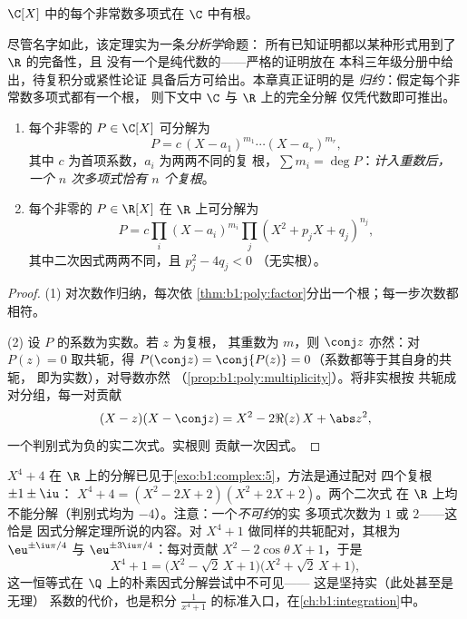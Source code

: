 \begin{theorem}[代数基本定理]\label{thm:b1:poly:fta}
$\C[X]$ 中的每个非常数多项式在
$\C$ 中有根。
\end{theorem}
\admitted

\begin{remark}
尽管名字如此，该定理实为一条\emph{分析学}命题：
所有已知证明都以某种形式用到了 $\R$ 的完备性，且
没有一个是纯代数的——严格的证明放在
本科三年级分册中给出，待复积分或紧性论证
具备后方可给出。本章真正证明的是
\emph{归约}：假定每个非常数多项式都有一个根，
则下文中 $\C$ 与 $\R$ 上的完全分解
仅凭代数即可推出。
\end{remark}

\begin{corollary}[$\C$ 与 $\R$ 上的因式分解]\label{cor:b1:poly:factorization}
\begin{enumerate}
  \item 每个非零的 $P \in \C[X]$ 可分解为
        \[
        P = c\, (X - a_1)^{m_1} \cdots (X - a_r)^{m_r},
        \]
        其中 $c$ 为首项系数，$a_i$ 为两两不同的复
        根，$\sum m_i = \deg P$：\emph{计入重数后，
        一个 $n$ 次多项式恰有 $n$ 个复根}。
  \item 每个非零的 $P \in \R[X]$ 在 $\R$ 上可分解为
        \[
        P = c \prod_i (X - a_i)^{m_i} \prod_j (X^2 + p_j X +
        q_j)^{n_j},
        \]
        其中二次因式两两不同，且 $p_j^2 - 4q_j < 0$
        （无实根）。
\end{enumerate}
\end{corollary}

\begin{proof}
(1) 对次数作归纳，每次依
\cref{thm:b1:poly:factor}分出一个根；每一步次数都相符。

(2) 设 $P$ 的系数为实数。若 $z$ 为复根，
其重数为 $m$，则 $\conj z$ 亦然：对 $P(z) = 0$ 取共轭，得
$P(\conj z) = \conj{P(z)} = 0$（系数都等于其自身的共轭，
即为实数），对导数亦然
（\cref{prop:b1:poly:multiplicity}）。将非实根按
共轭成对分组，每一对贡献
\[
(X - z)(X - \conj z) = X^2 - 2\Re(z)\, X + \abs z^2 ,
\]
一个判别式为负的实二次式。实根则
贡献一次因式。
\end{proof}

\begin{example}\label{ex:b1:poly:factorexample}
$X^4 + 4$ 在 $\R$ 上的分解已见于\cref{exo:b1:complex:5}，方法是通过配对
四个复根 $\pm 1 \pm \iu$：
$X^4 + 4 = (X^2 - 2X + 2)(X^2 + 2X + 2)$。两个二次式
在 $\R$ 上均不能分解（判别式均为 $-4$）。注意：一个\emph{不可约}的实
多项式次数为 $1$ 或 $2$——这恰是
因式分解定理所说的内容。对
$X^4 + 1$ 做同样的共轭配对，其根为 $\eu^{\pm\iu\pi/4}$ 与
$\eu^{\pm3\iu\pi/4}$：每对贡献 $X^2 -
2\cos\theta\,X + 1$，于是
\[
X^4 + 1 = \bigl(X^2 - \sqrt2\,X + 1\bigr)
\bigl(X^2 + \sqrt2\,X + 1\bigr) ,
\]
这一恒等式在 $\Q$ 上的朴素因式分解尝试中不可见——
这是坚持实（此处甚至是无理）
系数的代价，也是积分 $\frac1{x^4 +
1}$ 的标准入口，在\cref{ch:b1:integration}中。
\end{example}

